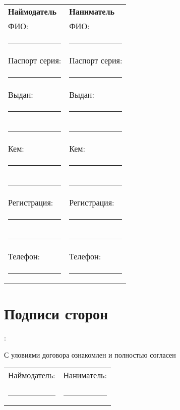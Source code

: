 \documentclass[a4paper, 11pt]{article}
\begin{document}
\begin{tabular}{ll}
\textbf{Наймодатель}         & \textbf{Наниматель} \\
ФИО:                         & ФИО: \\
\rule{0.45\textwidth}{0.5pt} & \rule{0.45\textwidth}{0.5pt} \\

Паспорт серия:               & Паспорт серия: \\
\rule{0.45\textwidth}{0.5pt} & \rule{0.45\textwidth}{0.5pt} \\

Выдан:                       & Выдан: \\
\rule{0.45\textwidth}{0.5pt} & \rule{0.45\textwidth}{0.5pt} \\
\rule{0.45\textwidth}{0.5pt} & \rule{0.45\textwidth}{0.5pt} \\

Кем:                         & Кем: \\
\rule{0.45\textwidth}{0.5pt} & \rule{0.45\textwidth}{0.5pt} \\
\rule{0.45\textwidth}{0.5pt} & \rule{0.45\textwidth}{0.5pt} \\

Регистрация:                 & Регистрация: \\
\rule{0.45\textwidth}{0.5pt} & \rule{0.45\textwidth}{0.5pt} \\
\rule{0.45\textwidth}{0.5pt} & \rule{0.45\textwidth}{0.5pt} \\

Телефон:                     & Телефон: \\
\rule{0.45\textwidth}{0.5pt} & \rule{0.45\textwidth}{0.5pt} \\

\end{tabular}

\section{Подписи сторон}:

С уловиями договора ознакомлен и полностью согласен \\

\begin{tabular}{ll}
Наймодатель:                 & Наниматель: \\
&\\
\rule{0.45\textwidth}{0.5pt} & \rule{0.45\textwidth}{0.5pt} \\
\end{tabular}
\end{document}
